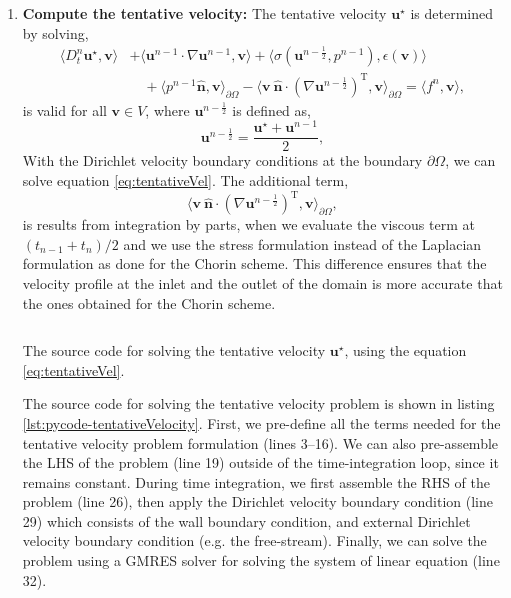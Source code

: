 	\begin{enumerate}
	\item \textbf{Compute the tentative velocity:} The tentative velocity $\mathbf{u}^{\star}$ is determined by solving,
		\begin{equation}
		\begin{split}
		\langle D_t^n \mathbf{u}^{\star}, \mathbf{v} \rangle &+ \langle \mathbf{u}^{n-1}\cdot\nabla\mathbf{u}^{n-1},\mathbf{v}\rangle + \langle \sigma(\mathbf{u}^{n-\frac{1}{2}},p^{n-1}), \epsilon(\mathbf{v}) \rangle \quad \\ &\quad+ \langle p^{n-1}\hat{\mathbf{n}},\mathbf{v}\rangle_{\partial \Omega} - \langle \mathbf{v}\ \hat{\mathbf{n}} \cdot (\nabla \mathbf{u}^{n-\frac{1}{2}} )^{\mathrm{T}},\mathbf{v} \rangle_{\partial \Omega} = \langle f^n,\mathbf{v} \rangle,
		\end{split}
		\label{eq:tentativeVel}
		\end{equation}
	is valid for all $\mathbf{v} \in V$, where $\mathbf{u}^{n-\frac{1}{2}}$ is defined as,
		\begin{equation}
		\mathbf{u}^{n-\frac{1}{2}} = \frac{\mathbf{u}^{\star}+\mathbf{u}^{n-1}}{2},
		\end{equation}
	With the Dirichlet velocity boundary conditions at the boundary $\partial \Omega$, we can solve equation \ref{eq:tentativeVel}. The additional term,
		\begin{equation}
		\langle \mathbf{v}\ \hat{\mathbf{n}} \cdot (\nabla \mathbf{u}^{n-\frac{1}{2}} )^{\mathrm{T}},\mathbf{v} \rangle_{\partial \Omega},
		\end{equation}
	is results from integration by parts, when we evaluate the viscous term at $(t_{n-1} + t_n)/2$ and we use the stress formulation instead of the Laplacian formulation as done for the Chorin scheme. This difference ensures that the velocity profile at the inlet and the outlet of the domain is more accurate that the ones obtained for the Chorin scheme. 
	
		\begin{listing}[!t]
		\inputminted[fontseries=courier,obeytabs,fontsize=\scriptsize,mathescape,linenos,numbersep=5pt,frame=lines,framesep=2mm,xleftmargin=20mm,xrightmargin=20mm]{python}{figures/eulerian/tentativeVelocity.py}
		\caption{The source code for solving the tentative velocity $\mathbf{u}^{\star}$, using the equation \ref{eq:tentativeVel}.}
		\label{lst:pycode-tentativeVelocity}
		\end{listing}	
	
	The source code for solving the tentative velocity problem is shown in listing \ref{lst:pycode-tentativeVelocity}. First, we pre-define all the terms needed for the tentative velocity problem formulation (lines \numrange{3}{16}). We can also pre-assemble the LHS of the problem (line 19) outside of the time-integration loop, since it remains constant. During time integration, we first assemble the RHS of the problem (line 26), then apply the Dirichlet velocity boundary condition (line 29) which consists of the wall boundary condition, and external Dirichlet velocity boundary condition (e.g. the free-stream). Finally, we can solve the problem using a GMRES solver for solving the system of linear equation (line 32).
	

\end{enumerate}
